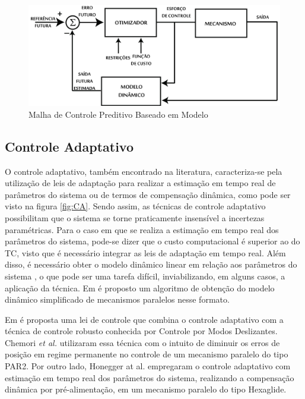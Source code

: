 \documentclass[]{politex}
\begin{document}
\begin{figure}[h]
	\centering
	\includegraphics[scale=0.11]{../figures/CPM.jpg}  
	\caption{Malha de Controle Preditivo Baseado em Modelo}
	\label{fig:CPM}
\end{figure}

\subsection{Controle Adaptativo}

O controle adaptativo, também encontrado na literatura, caracteriza-se pela utilização de leis de adaptação para realizar a estimação em tempo real de parâmetros do sistema ou de termos de compensação dinâmica, como pode ser visto na figura \ref{fig:CA}. Sendo assim, as técnicas de controle adaptativo possibilitam que o sistema se torne praticamente insensível a incertezas paramétricas. Para o caso em que se realiza a estimação em tempo real dos parâmetros do sistema, pode-se dizer que o custo computacional é superior ao do TC, visto que é necessário integrar as leis de adaptação em tempo real. Além disso, é necessário obter o modelo dinâmico linear em relação aos parâmetros do sistema \cite{SlotiniA}, o que pode ser uma tarefa difícil, inviabilizando, em alguns casos, a aplicação da técnica. Em \cite{CodoureyBurdet} é proposto um algoritmo de obtenção do modelo dinâmico simplificado de mecanismos paralelos nesse formato.

Em \cite{SlotiniA} é proposta uma lei de controle que combina o controle adaptativo com a técnica de controle robusto conhecida por Controle por Modos Deslizantes. Chemori \emph{et al.} \cite{Chemori} utilizaram essa técnica  com o intuito de diminuir os erros de posição em regime permanente no controle de um mecanismo paralelo do tipo PAR2. Por outro lado, Honegger at al. \cite{Honegger} empregaram o controle adaptativo com estimação em tempo real dos parâmetros do sistema, realizando a compensação dinâmica por pré-alimentação, em um mecanismo  paralelo do tipo Hexaglide.
\end{document}
